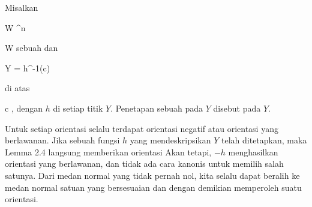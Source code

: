 {}
{

Misalkan

\mavergleichskette
{\vergleichskette
{ W
}
{ \subseteq }{ \R^n
}
{  }{
}
{    }{
}
{   }{
}
}
{}{}{}

 { W } { \R
} {}
sebuah
dan

\mavergleichskette
{\vergleichskette
{ Y
}
{ = }{ h^{-1}(c)
}
{  }{
}
{    }{
}
{   }{
}
}
{}{}{}

di atas

\mavergleichskette
{\vergleichskette
{ c
}
{ \in }{ \R
}
{  }{
}
{    }{
}
{   }{
}
}
{}{}{,}
dengan $h$
di setiap titik $Y$. Penetapan sebuah
pada $Y$ disebut
pada $Y$.

}

Untuk setiap orientasi selalu terdapat orientasi negatif atau orientasi yang berlawanan. Jika sebuah fungsi $h$ yang mendeskripsikan $Y$ telah ditetapkan, maka
Lemma 2.4
langsung memberikan orientasi
 Akan tetapi, $-h$ menghasilkan orientasi yang berlawanan, dan tidak ada cara kanonis untuk memilih salah satunya. Dari medan normal yang tidak pernah nol, kita selalu dapat beralih ke medan normal satuan yang bersesuaian dan dengan demikian memperoleh suatu orientasi.



